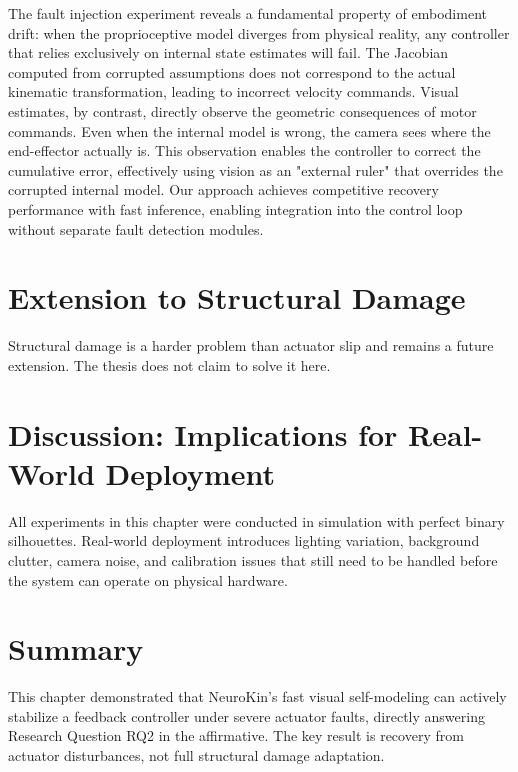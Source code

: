 \documentclass[12pt,a4paper,oneside]{report}
\begin{document}
The fault injection experiment reveals a fundamental property of embodiment drift: when the proprioceptive model diverges from physical reality, any controller that relies exclusively on internal state estimates will fail. The Jacobian computed from corrupted assumptions does not correspond to the actual kinematic transformation, leading to incorrect velocity commands. Visual estimates, by contrast, directly observe the geometric consequences of motor commands. Even when the internal model is wrong, the camera sees where the end-effector actually is. This observation enables the controller to correct the cumulative error, effectively using vision as an "external ruler" that overrides the corrupted internal model. Our approach achieves competitive recovery performance with fast inference, enabling integration into the control loop without separate fault detection modules.

\section{Extension to Structural Damage}

Structural damage is a harder problem than actuator slip and remains a future extension. The thesis does not claim to solve it here.

\section{Discussion: Implications for Real-World Deployment}

All experiments in this chapter were conducted in simulation with perfect binary silhouettes. Real-world deployment introduces lighting variation, background clutter, camera noise, and calibration issues that still need to be handled before the system can operate on physical hardware.

\section{Summary}

This chapter demonstrated that NeuroKin's fast visual self-modeling can actively stabilize a feedback controller under severe actuator faults, directly answering Research Question RQ2 in the affirmative. The key result is recovery from actuator disturbances, not full structural damage adaptation.
\end{document}

